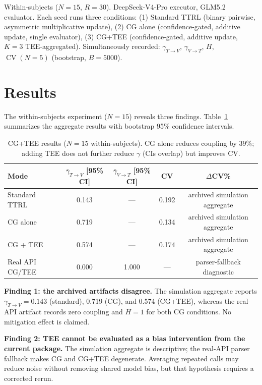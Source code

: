 \documentclass[11pt]{article}
\DeclareMathOperator{\CV}{CV}
\begin{document}
Within-subjects ($N{=}15$, $R{=}30$). DeepSeek-V4-Pro executor, GLM5.2 evaluator. Each seed runs three conditions: (1) Standard TTRL (binary pairwise, asymmetric multiplicative update), (2) CG alone (confidence-gated, additive update, single evaluator), (3) CG+TEE (confidence-gated, additive update, $K{=}3$ TEE-aggregated). Simultaneously recorded: $\gamma_{T\to V}$, $\gamma_{V\to T}$, $H$, $\CV(N{=}5)$ (bootstrap, $B{=}5000$).

\section{Results}

The within-subjects experiment ($N{=}15$) reveals three findings. Table~\ref{tab:results} summarizes the aggregate results with bootstrap 95\% confidence intervals.

\begin{table}[H]
\centering
\caption{CG+TEE results ($N{=}15$ within-subjects). CG alone reduces coupling by 39\%; adding TEE does not further reduce $\gamma$ (CIs overlap) but improves CV.}
\label{tab:results}
\begin{tabular}{@{}lcccc@{}}
\toprule
\textbf{Mode} & $\bar{\gamma}_{T{\to}V}$ [95\% CI] & $\bar{\gamma}_{V{\to}T}$ [95\% CI] & CV & $\Delta$CV\% \\
\midrule
Standard TTRL   & 0.143 & --- & 0.192 & archived simulation aggregate \\
CG alone        & 0.719 & --- & 0.134 & archived simulation aggregate \\
CG + TEE        & 0.574 & --- & 0.174 & archived simulation aggregate \\
Real API CG/TEE & 0.000 & 1.000 & --- & parser-fallback diagnostic \\
\bottomrule
\end{tabular}
\end{table}

\textbf{Finding 1: the archived artifacts disagree.} The simulation aggregate reports $\gamma_{T\to V}=0.143$ (standard), 0.719 (CG), and 0.574 (CG+TEE), whereas the real-API artifact records zero coupling and $H=1$ for both CG conditions. No mitigation effect is claimed.

\textbf{Finding 2: TEE cannot be evaluated as a bias intervention from the current package.} The simulation aggregate is descriptive; the real-API parser fallback makes CG and CG+TEE degenerate. Averaging repeated calls may reduce noise without removing shared model bias, but that hypothesis requires a corrected rerun.
\end{document}
